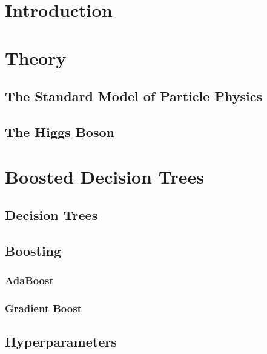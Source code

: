 \documentclass[12pt,a4paper,openright]{scrreprt}
\begin{document}
\tableofcontents

\newpage

\chapter{Introduction}
\label{cha:introduction}

\chapter{Theory}
\label{cha:theory}

\section{The Standard Model of Particle Physics}
\label{sec:the_standard_model_of_particle_physics}

\section{The Higgs Boson}
\label{sec:the_higgs_boson}

\chapter{Boosted Decision Trees}
\label{cha:boosted_decision_trees}

\section{Decision Trees}
\label{sec:decision_trees}

\section{Boosting}
\label{sec:boosting}

\subsection{AdaBoost}
\label{sub:adaboost}

\subsection{Gradient Boost}
\label{sub:gradient_boost}

\section{Hyperparameters}
\label{sec:hyperparameters}
\end{document}
